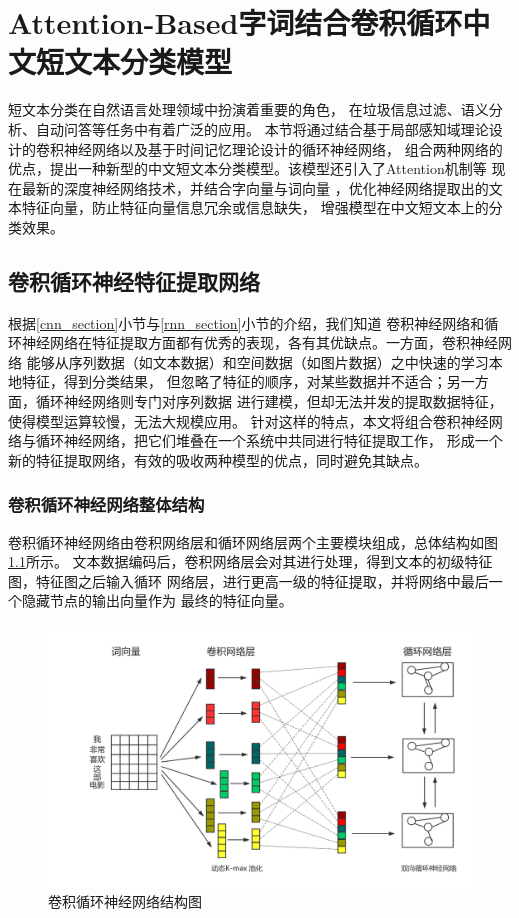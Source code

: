 \chapter{Attention-Based字词结合卷积循环中文短文本分类模型}
短文本分类在自然语言处理领域中扮演着重要的角色，
在垃圾信息过滤、语义分析、自动问答等任务中有着广泛的应用。
本节将通过结合基于局部感知域理论设计的卷积神经网络以及基于时间记忆理论设计的循环神经网络，
组合两种网络的优点，提出一种新型的中文短文本分类模型。该模型还引入了Attention机制等
现在最新的深度神经网络技术，并结合字向量与词向量
，优化神经网络提取出的文本特征向量，防止特征向量信息冗余或信息缺失，
增强模型在中文短文本上的分类效果。
\section{卷积循环神经特征提取网络}
\label{CLSTM_section}
根据\ref{cnn_section}小节与\ref{rnn_section}小节的介绍，我们知道
卷积神经网络和循环神经网络在特征提取方面都有优秀的表现，各有其优缺点。一方面，卷积神经网络
能够从序列数据（如文本数据）和空间数据（如图片数据）之中快速的学习本地特征，得到分类结果，
但忽略了特征的顺序，对某些数据并不适合；另一方面，循环神经网络则专门对序列数据
进行建模，但却无法并发的提取数据特征，使得模型运算较慢，无法大规模应用。
针对这样的特点，本文将组合卷积神经网络与循环神经网络，把它们堆叠在一个系统中共同进行特征提取工作，
形成一个新的特征提取网络，有效的吸收两种模型的优点，同时避免其缺点。
\subsection{卷积循环神经网络整体结构}
卷积循环神经网络由卷积网络层和循环网络层两个主要模块组成，总体结构如图\ref{CLSTM}所示。
文本数据编码后，卷积网络层会对其进行处理，得到文本的初级特征图，特征图之后输入循环
网络层，进行更高一级的特征提取，并将网络中最后一个隐藏节点的输出向量作为
最终的特征向量。
\begin{figure}[h]
    \includegraphics[scale=0.4]{picture/CLSTM.png}
    \caption{卷积循环神经网络结构图}
    \label{CLSTM}
\end{figure}
